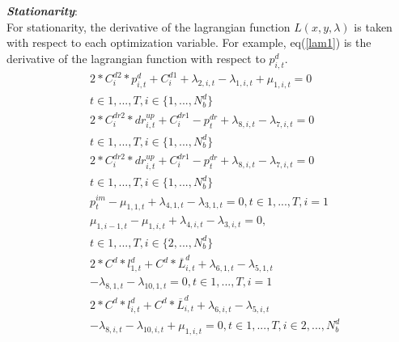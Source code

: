 \textbf{\emph{Stationarity}}: \\
For stationarity, the derivative of the lagrangian function  $\textit{L}(x,y,\lambda)$ is taken with respect to each optimization variable. For example, eq(\ref{lam1}) is the derivative of the lagrangian function with respect to $p^d_{i,t}$.
\begin{align}
& 2*C^{d2}_i*p^d_{i,t} + C^{d1}_i + \lambda_{2,i,t}-\lambda_{1,i,t}+\mu_{1,i,t} =0 \nonumber\\ 
& t\in{1,...,T},i \in \{1,...,N^d_b\} \label{lam1}\\
& 2*C^{dr2}_i*dr^{up}_{i,t} + C^{dr1}_i - p ^{dr}_t + \lambda_{8,i,t}-\lambda_{7,i,t} =0 \nonumber\\ 
& t\in{1,...,T},i \in \{1,...,N^d_b\}  \\
& 2*C^{dr2}_i*dr^{up}_{i,t} + C^{dr1}_i - p ^{dr}_t + \lambda_{8,i,t}-\lambda_{7,i,t} =0 \nonumber\\ 
& t\in{1,...,T},i \in \{1,...,N^d_b\} \\
& p^{im}_t -\mu_{1,1,t}+ \lambda_{4,1,t}-\lambda_{3,1,t} =0, t\in{1,...,T}, i=1 \\
& \mu_{1,i-1,t} -\mu_{1,i,t}+ \lambda_{4,i,t}-\lambda_{3,i,t} =0,  \nonumber\\ 
& t\in{1,...,T},i \in \{2,...,N^d_b\} \\
& 2*C^{d}*l^d_{1,t} + C^{d}*\overline{L}^d_{i,t} + \lambda_{6,1,t}-\lambda_{5,1,t}\nonumber\\
&-\lambda_{8,1,t}-\lambda_{10,1,t} =0 , t\in{1,...,T}, i = 1  \label{lam1}\\
& 2*C^{d}*l^d_{i,t} + C^{d}*\overline{L}^d_{i,t} + \lambda_{6,i,t}-\lambda_{5,i,t}\nonumber\\
& -\lambda_{8,i,t}-\lambda_{10,i,t}+\mu_{1,i,t}=0 , t\in{1,...,T}, i\in{2,...,N^d_b}  \label{lam1}
\end{align}

